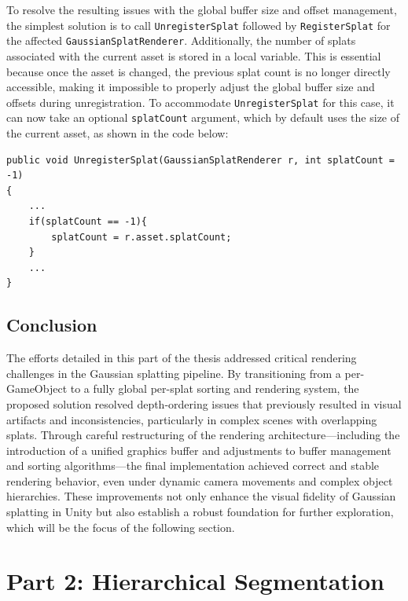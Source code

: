 \documentclass[12pt]{article}
\begin{document}
To resolve the resulting issues with the global buffer size and offset management, the simplest solution is to call \texttt{UnregisterSplat} followed by
\linebreak 
\texttt{RegisterSplat} for the affected \texttt{GaussianSplatRenderer}. Additionally, the number of splats associated with the current asset is stored in a local variable. This is essential because once the asset is changed, the previous splat count is no longer directly accessible, making it impossible to properly adjust the global buffer size and offsets during unregistration. To accommodate \texttt{UnregisterSplat} for this case, it can now take an optional \texttt{splatCount} argument, which by default uses the size of the current asset, as shown in the code below:
\begin{lstlisting}[tabsize=2,caption=A small adjustment to UnregisterSplat, label=code:unregister,breaklines=true,breakatwhitespace=true,basicstyle=\ttfamily\footnotesize]
public void UnregisterSplat(GaussianSplatRenderer r, int splatCount = -1)
{
	...
	if(splatCount == -1){
		splatCount = r.asset.splatCount;
	}	
	...
}
\end{lstlisting}
\subsection{Conclusion}
The efforts detailed in this part of the thesis addressed critical rendering challenges in the Gaussian splatting pipeline. By transitioning from a per-GameObject to a fully global per-splat sorting and rendering system, the proposed solution resolved depth-ordering issues that previously resulted in visual artifacts and inconsistencies, particularly in complex scenes with overlapping splats. Through careful restructuring of the rendering architecture—including the introduction of a unified graphics buffer and adjustments to buffer management and sorting algorithms—the final implementation achieved correct and stable rendering behavior, even under dynamic camera movements and complex object hierarchies. These improvements not only enhance the visual fidelity of Gaussian splatting in Unity but also establish a robust foundation for further exploration, which will be the focus of the following section.
\section{Part 2: Hierarchical Segmentation}  
\end{document}
